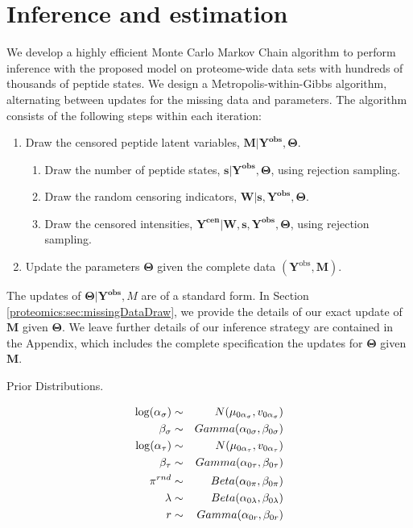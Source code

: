 \section{Inference and estimation}
\label{proteomics:sec:estimation}

We develop a highly efficient Monte Carlo Markov Chain algorithm to perform inference with the proposed model on proteome-wide data sets with hundreds of thousands of peptide states.
We design a Metropolis-within-Gibbs algorithm, alternating between updates for the missing data and parameters.
The algorithm consists of the following steps within each iteration:
%
\begin{enumerate}
\item Draw the censored peptide latent variables, $\mathbf{M}\vert\mathbf{Y^{obs}}, \bm \Theta$.

\begin{enumerate}
\item Draw the number of peptide states, $\bm s \vert \mathbf{Y^{obs}}, \bm \Theta$, using rejection sampling.
\item Draw the random censoring indicators, $\bm{W} \vert \bm s,  \mathbf{Y^{obs}}, \bm \Theta$.
\item Draw the censored intensities, $\mathbf{Y^{cen}} \vert \bm{W},\bm{s}, \bm{Y^{obs}}, \bm{\Theta}$, using rejection sampling.
\end{enumerate}
\item Update the parameters $\bm \Theta$ given the complete data $(\bm Y^\mathrm{obs}, \bm M)$.
\end{enumerate}
%
The updates of $\bm{\Theta} | \bm{Y^{obs}}, M$ are of a standard form.
In Section \ref{proteomics:sec:missingDataDraw}, we provide the details of our exact update of $\bm M$ given $\bm \Theta$.
We leave further details of our inference strategy are contained in the Appendix, which includes the complete specification the updates for $\bm \Theta$ given $\bm M$.

\begin{table}
\caption{Prior Distributions.}
\begin{eqnarray*}
\log(\alpha_\sigma) &\sim& N(\mu_{0 \alpha_\sigma}, v_{0 \alpha_\sigma}) \\
\beta_\sigma &\sim& Gamma(\alpha_{0 \sigma}, \beta_{0 \sigma}) \\
\log(\alpha_\tau) &\sim& N(\mu_{0 \alpha_\tau}, v_{0 \alpha_\tau}) \\
\beta_\tau &\sim& Gamma(\alpha_{0 \tau}, \beta_{0 \tau}) \\
\mbox{\ensuremath{\pi}}^{rnd} & \sim & Beta(\alpha_{0\pi}, \beta_{0\pi})\\
\lambda & \sim & Beta(\alpha_{0 \lambda}, \beta_{0 \lambda})\\
r & \sim & Gamma(\alpha_{0r}, \beta_{0r})
\end{eqnarray*}
\end{table}


